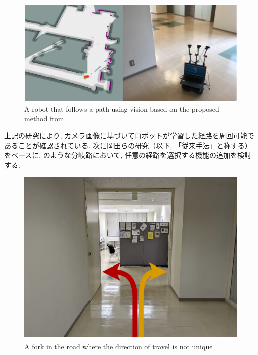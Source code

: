 \begin{figure}[hbtp]
     \centering
    \includegraphics[keepaspectratio, scale=0.5]
         {images/okada_nav.png}
    \caption{A robot that follows a path using vision based on the proposed method from \cite{okada1}}
    \label{Fig:okada_nav}
\end{figure}

\newpage

上記の研究により, カメラ画像に基づいてロボットが学習した経路を周回可能であることが確認されている. 次に岡田らの研究（以下, 「従来手法」と称する）をベースに, のような分岐路において, 任意の経路を選択する機能の追加を検討する.

\vspace{1cm}

\begin{figure}[hbtp]
     \centering
    \includegraphics[keepaspectratio, scale=0.5]
         {images/road.png}
    \caption{A fork in the road where the direction of travel is not unique}
    \label{Fig:road}
\end{figure}


